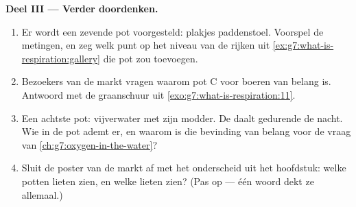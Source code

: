\begin{problem}
\medskip\noindent\textbf{Deel III --- Verder doordenken.}
\begin{enumerate}[resume]
  \item Er wordt een zevende pot voorgesteld: plakjes paddenstoel.
        Voorspel de metingen, en zeg welk punt op het niveau van de rijken
        uit \cref{ex:g7:what-is-respiration:gallery} die pot zou
        toevoegen.
  \item Bezoekers van de markt vragen waarom pot C voor boeren van belang
        is. Antwoord met de graanschuur uit
        \cref{exo:g7:what-is-respiration:11}.
  \item Een achtste pot: vijverwater met zijn modder. De  daalt
        gedurende de nacht. Wie in de pot ademt er, en waarom is die
        bevinding van belang voor de vraag van
        \cref{ch:g7:oxygen-in-the-water}?
  \item Sluit de poster van de markt af met het onderscheid uit het
        hoofdstuk: welke potten lieten \emph{} zien, en welke
        lieten \emph{} zien? (Pas op --- één woord dekt ze
        allemaal.)
\end{enumerate}
\end{problem}
